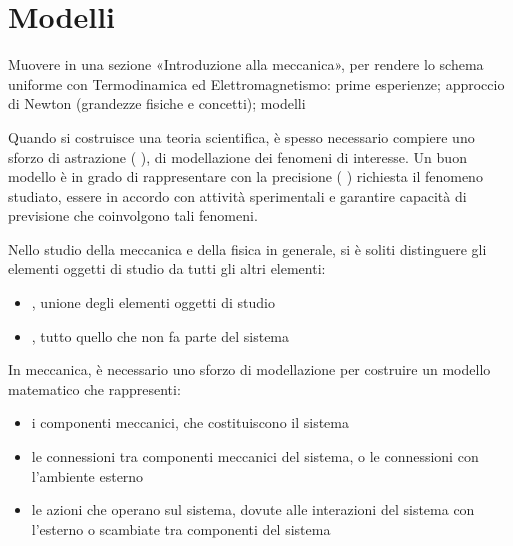 \documentclass[letterpaper,10pt,italian]{jupyterBook}
\begin{document}
\sphinxstepscope


\section{Modelli}
\label{\detokenize{ch/mechanics/models:modelli}}\label{\detokenize{ch/mechanics/models:physics-hs-mechanics-models}}\label{\detokenize{ch/mechanics/models::doc}}
\sphinxAtStartPar
Muovere in una sezione «Introduzione alla meccanica», per rendere lo schema uniforme con Termodinamica ed Elettromagnetismo: prime esperienze; approccio di Newton (grandezze fisiche e concetti); modelli

\sphinxAtStartPar
Quando si costruisce una teoria scientifica, è spesso necessario compiere uno sforzo di astrazione ( ), di modellazione dei fenomeni di interesse. Un buon modello è in grado di rappresentare con la precisione ( ) richiesta il fenomeno studiato, essere in accordo con attività sperimentali e garantire capacità di previsione che coinvolgono tali fenomeni.

\sphinxAtStartPar
Nello studio della meccanica e della fisica in generale, si è soliti distinguere gli elementi oggetti di studio da tutti gli altri elementi:
\begin{itemize}
\item {} 
\sphinxAtStartPar
{}, unione degli elementi oggetti di studio

\item {} 
\sphinxAtStartPar
{}, tutto quello che non fa parte del sistema

\end{itemize}

\sphinxAtStartPar
In meccanica, è necessario uno sforzo di modellazione per costruire un modello matematico che rappresenti:
\begin{itemize}
\item {} 
\sphinxAtStartPar
i componenti meccanici, che costituiscono il sistema

\item {} 
\sphinxAtStartPar
le connessioni tra componenti meccanici del sistema, o le connessioni con l’ambiente esterno

\item {} 
\sphinxAtStartPar
le azioni che operano sul sistema, dovute alle interazioni del sistema con l’esterno o scambiate tra componenti del sistema

\end{itemize}
\end{document}
